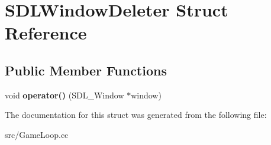 \hypertarget{struct_s_d_l_window_deleter}{}\section{S\+D\+L\+Window\+Deleter Struct Reference}
\label{struct_s_d_l_window_deleter}
\subsection*{Public Member Functions}
\begin{DoxyCompactItemize}
\item 
\hypertarget{struct_s_d_l_window_deleter_a2aedcc99c3756ae090c38badabeb10b1}{}void {\bfseries operator()} (S\+D\+L\+\_\+\+Window $\ast$window)\label{struct_s_d_l_window_deleter_a2aedcc99c3756ae090c38badabeb10b1}

\end{DoxyCompactItemize}


The documentation for this struct was generated from the following file\+:\begin{DoxyCompactItemize}
\item 
src/Game\+Loop.\+cc\end{DoxyCompactItemize}
